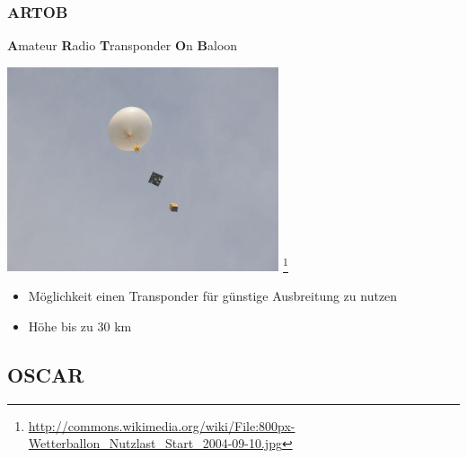 \begin{frame}
    \frametitle{ARTOB}

    \textbf{A}mateur \textbf{R}adio \textbf{T}ransponder \textbf{O}n \textbf{B}aloon

    \begin{center}
        \includegraphics[width=0.6\textwidth,height=.5\textheight,keepaspectratio]{bv11/Wetterballon_Nutzlast.jpg}
        \footnote{\tiny \url{http://commons.wikimedia.org/wiki/File:800px-Wetterballon_Nutzlast_Start_2004-09-10.jpg}}
    \end{center}

    \begin{itemize}
        \item Möglichkeit einen Transponder für günstige Ausbreitung zu nutzen
        \item Höhe bis zu 30 km
    \end{itemize}


\end{frame}

\subsection{OSCAR}

